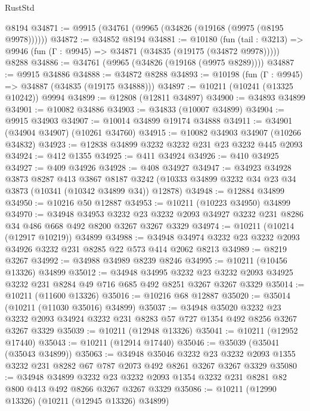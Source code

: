 \begin{lexlean}{RustStd}
\begin{coremodule}
    @8194
@34871 := @9915 (@34761 (@9965 (@34826 (@19168 (@9975 (@8195 @9978))))))
@34872 := @34852 @8194
@34881 := @10180
    (fun (tail : @3213) => @9946 (fun (Γ : @9945) => @34871 (@34835 (@19175 (@34872 @9978)))))
    @8288
@34886 := @34761 (@9965 (@34826 (@19168 (@9975 @8289))))
@34887 := @9915 @34886
@34888 := @34872 @8288
@34893 := @10198 (fun (Γ : @9945) => @34887 (@34835 (@19175 @34888)))
@34897 := @10211 (@10241 (@13325 @10242)) @9994
@34899 := @12808 (@12811 @34897)
@34900 := @34893 @34899
@34901 := @10082 @34886
@34903 := @34833 (@10007 @34899)
@34904 := @9915 @34903
@34907 := @10014 @34899 @19174 @34888
@34911 := @34901 (@34904 @34907) (@10261 @34760)
@34915 := @10082 @34903 @34907 (@10266 @34832)
@34923 := @12838 @34899 @3232 @3232 @231 @23 @3232 @445 @2093
@34924 := @412 @1355
@34925 := @411 @34924
@34926 := @410 @34925
@34927 := @409 @34926
@34928 := @408 @34927
@34947 := @34923
    @34928
    @3873
    @8287
    @413
    @3867
    @8187
    @3242
    (@10333 @34899 @3232 @34 @23 @34 @3873 (@10341 (@10342 @34899 @34)) @12878)
@34948 := @12884 @34899
@34950 := @10216 @50 @12887
@34953 := @10211 (@10223 @34950) @34899
@34970 := @34948
    @34953
    @3232
    @23
    @3232
    @2093
    @34927
    @3232
    @231
    @8286
    @34
    @486
    @668
    @492
    @8200
    @3267
    @3267
    @3329
@34974 := @10211 (@10214 (@12917 @10219)) @34899
@34988 := @34948 @34974 @3232 @23 @3232 @2093 @34926 @3232 @231 @8285 @22 @573 @414 @2062 @8213
@34989 := @8219 @3267
@34992 := @34988 @34989 @8239 @8246
@34995 := @10211 (@10456 @13326) @34899
@35012 := @34948
    @34995
    @3232
    @23
    @3232
    @2093
    @34925
    @3232
    @231
    @8284
    @49
    @716
    @685
    @492
    @8251
    @3267
    @3267
    @3329
@35014 := @10211 (@11600 @13326)
@35016 := @10216 @68 @12887
@35020 := @35014 (@10211 (@11030 @35016) @34899)
@35037 := @34948
    @35020
    @3232
    @23
    @3232
    @2093
    @34924
    @3232
    @231
    @8283
    @57
    @727
    @1354
    @492
    @8256
    @3267
    @3267
    @3329
@35039 := @10211 (@12948 @13326)
@35041 := @10211 (@12952 @17440)
@35043 := @10211 (@12914 @17440)
@35046 := @35039 (@35041 (@35043 @34899))
@35063 := @34948
    @35046
    @3232
    @23
    @3232
    @2093
    @1355
    @3232
    @231
    @8282
    @67
    @787
    @2073
    @492
    @8261
    @3267
    @3267
    @3329
@35080 := @34948
    @34899
    @3232
    @23
    @3232
    @2093
    @1354
    @3232
    @231
    @8281
    @82
    @800
    @413
    @492
    @8266
    @3267
    @3267
    @3329
@35086 := @10211 (@12990 @13326) (@10211 (@12945 @13326) @34899)

\end{coremodule}
\end{lexlean}
